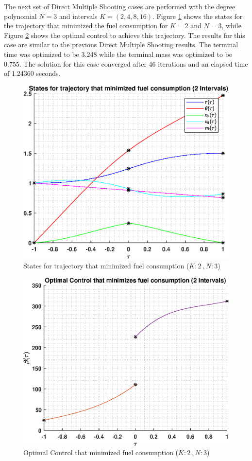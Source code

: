 \documentclass[]{article}
\begin{document}
\noindent
The next set of Direct Multiple Shooting cases are performed with the degree polynomial \(N = 3\) and intervals \(K = (2,4,8,16)\). Figure \ref{fig:directStatesK2Poly3} shows the states for the trajectory that minimized the fuel consumption for \(K = 2\) and  \(N = 3\), while Figure \ref{fig:directControlK2Poly3} shows the optimal control to achieve this trajectory. The results for this case are similar to the previous Direct Multiple Shooting results. The terminal time was optimized to be 3.248 while the terminal mass was optimized to be 0.755. The solution for this case converged after 46 iterations and an elapsed time of 1.24360 seconds.
\begin{figure}
	\centering
	\includegraphics[scale=0.75]{directStatesK2Poly3.eps}
	\caption{States for trajectory that minimized fuel consumption (\(K:2\ , N:3\))}
	\label{fig:directStatesK2Poly3}
\end{figure}
\begin{figure}
	\centering
	\includegraphics[scale=0.75]{directControlK2Poly3.eps}
	\caption{Optimal Control that minimized fuel consumption (\(K:2\ , N:3\))}
	\label{fig:directControlK2Poly3}
\end{figure}
\end{document}
